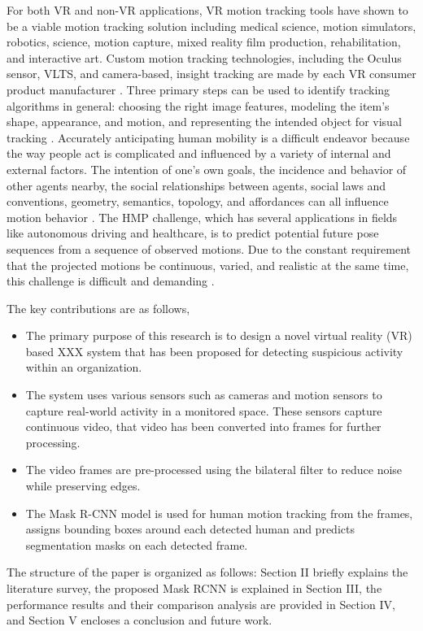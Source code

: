 \documentclass[conference]{IEEEtran}
\begin{document}
For both VR and non-VR applications, VR motion tracking tools have shown to be a viable motion tracking solution including medical science, motion simulators, robotics, science, motion capture, mixed reality film production, rehabilitation, and interactive art. Custom motion tracking technologies, including the Oculus sensor, VLTS, and camera-based, insight tracking are made by each VR consumer product manufacturer \cite{b7}. Three primary steps can be used to identify tracking algorithms in general: choosing the right image features, modeling the item's shape, appearance, and motion, and representing the intended object for visual tracking \cite{b8,b9}. Accurately anticipating human mobility is a difficult endeavor because the way people act is complicated and influenced by a variety of internal and external factors. The intention of one's own goals, the incidence and behavior of other agents nearby, the social relationships between agents, social laws and conventions, geometry, semantics, topology, and affordances can all influence motion behavior \cite{b10}. The HMP challenge, which has several applications in fields like autonomous driving and healthcare, is to predict potential future pose sequences from a sequence of observed motions. Due to the constant requirement that the projected motions be continuous, varied, and realistic at the same time, this challenge is difficult and demanding \cite{b11}.

The key contributions are as follows,
\begin{itemize}
\item The primary purpose of this research is to design a novel virtual reality (VR) based XXX system that has been proposed for detecting suspicious activity within an organization.
\item The system uses various sensors such as cameras and motion sensors to capture real-world activity in a monitored space. These sensors capture continuous video, that video has been converted into frames for further processing.
\item The video frames are pre-processed using the bilateral filter to reduce noise while preserving edges.
\item The Mask R-CNN model is used for human motion tracking from the frames, assigns bounding boxes around each detected human and predicts segmentation masks on each detected frame.
\end{itemize}

The structure of the paper is organized as follows: Section II briefly explains the literature survey, the proposed Mask RCNN is explained in Section III, the performance results and their comparison analysis are provided in Section IV, and Section V encloses a conclusion and future work.
\end{document}
